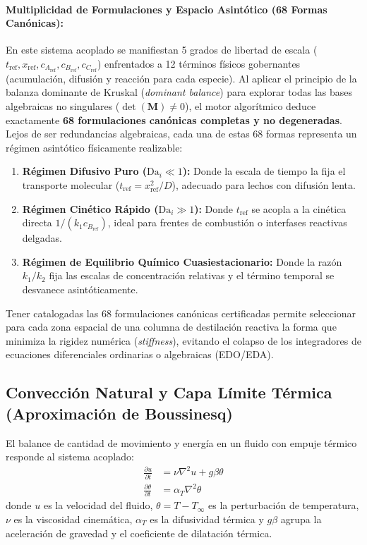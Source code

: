 \documentclass[11pt,a4paper]{article}
\theoremstyle{definition}
\theoremstyle{plain}
\theoremstyle{remark}
\newcommand{\refscale}[1]{#1_{\mathrm{ref}}}
\begin{document}
\paragraph{Multiplicidad de Formulaciones y Espacio Asintótico (68 Formas Canónicas):}
En este sistema acoplado se manifiestan 5 grados de libertad de escala ($\refscale{t}, \refscale{x}, \refscale{c_A}, \refscale{c_B}, \refscale{c_C}$) enfrentados a 12 términos físicos gobernantes (acumulación, difusión y reacción para cada especie). Al aplicar el principio de la balanza dominante de Kruskal (\textit{dominant balance}) para explorar todas las bases algebraicas no singulares ($\det(\mathbf{M}) \neq 0$), el motor algorítmico deduce exactamente \textbf{68 formulaciones canónicas completas y no degeneradas}. Lejos de ser redundancias algebraicas, cada una de estas 68 formas representa un régimen asintótico físicamente realizable:
\begin{enumerate}
    \item \textbf{Régimen Difusivo Puro ($\mathrm{Da}_i \ll 1$):} Donde la escala de tiempo la fija el transporte molecular ($\refscale{t} = \refscale{x}^2 / D$), adecuado para lechos con difusión lenta.
    \item \textbf{Régimen Cinético Rápido ($\mathrm{Da}_i \gg 1$):} Donde $\refscale{t}$ se acopla a la cinética directa $1/(k_1 \refscale{c_B})$, ideal para frentes de combustión o interfases reactivas delgadas.
    \item \textbf{Régimen de Equilibrio Químico Cuasiestacionario:} Donde la razón $k_1/k_2$ fija las escalas de concentración relativas y el término temporal se desvanece asintóticamente.
\end{enumerate}
Tener catalogadas las 68 formulaciones canónicas certificadas permite seleccionar para cada zona espacial de una columna de destilación reactiva la forma que minimiza la rigidez numérica (\textit{stiffness}), evitando el colapso de los integradores de ecuaciones diferenciales ordinarias o algebraicas (EDO/EDA).

\subsection{Convección Natural y Capa Límite Térmica (Aproximación de Boussinesq)}

El balance de cantidad de movimiento y energía en un fluido con empuje térmico responde al sistema acoplado:
\begin{align}
    \frac{\partial u}{\partial t} &= \nu \nabla^2 u + g\beta \theta \\
    \frac{\partial \theta}{\partial t} &= \alpha_T \nabla^2 \theta
\end{align}
donde $u$ es la velocidad del fluido, $\theta = T - T_\infty$ es la perturbación de temperatura, $\nu$ es la viscosidad cinemática, $\alpha_T$ es la difusividad térmica y $g\beta$ agrupa la aceleración de gravedad y el coeficiente de dilatación térmica.
\end{document}
